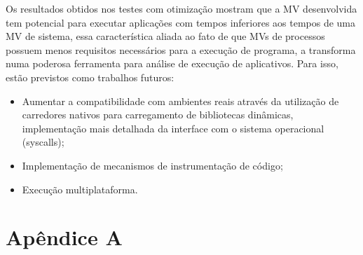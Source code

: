 \documentclass[11pt,twoside]{article}
\begin{document}
Os resultados obtidos nos testes com otimização mostram que a MV desenvolvida
tem potencial para executar aplicações com tempos inferiores aos tempos de uma
MV de sistema, essa característica aliada ao fato de que MVs de processos
possuem menos requisitos necessários para a execução de programa, a transforma
numa poderosa ferramenta para análise de execução de aplicativos. Para isso,
estão previstos como trabalhos futuros:

\begin{itemize}
 \item Aumentar a compatibilidade com ambientes reais através da utilização de
   carredores nativos para carregamento de bibliotecas dinâmicas, implementação
   mais detalhada da interface com o sistema operacional (syscalls);
 \item Implementação de mecanismos de instrumentação de código;
 \item Execução multiplataforma.
\end{itemize}

\newpage

\section*{Apêndice A} \label{ap:results}
\end{document}
